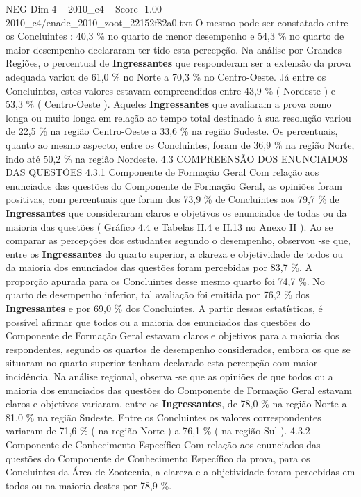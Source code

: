 \begin{textsample}{NEG Dim 4 – 2010\_c4 – Score -1.00 – 2010\_c4/enade\_2010\_zoot\_22152f82a0.txt}
O mesmo pode ser constatado entre os Concluintes : 40,3 \% no quarto de menor desempenho e 54,3 \% no quarto de maior desempenho declararam ter tido esta percepção.
Na análise por Grandes Regiões, o percentual de \textbf{Ingressantes} que responderam ser a extensão da prova adequada variou de 61,0 \% no Norte a 70,3 \% no Centro-Oeste.
Já entre os Concluintes, estes valores estavam compreendidos entre 43,9 \% ( Nordeste ) e 53,3 \% ( Centro-Oeste ).
Aqueles \textbf{Ingressantes} que avaliaram a prova como longa ou muito longa em relação ao tempo total destinado à sua resolução variou de 22,5 \% na região Centro-Oeste a 33,6 \% na região Sudeste.
Os percentuais, quanto ao mesmo aspecto, entre os Concluintes, foram de 36,9 \% na região Norte, indo até 50,2 \% na região Nordeste. 4.3 COMPREENSÃO DOS ENUNCIADOS DAS QUESTÕES 4.3.1 Componente de Formação Geral Com relação aos enunciados das questões do Componente de Formação Geral, as opiniões foram positivas, com percentuais que foram dos 73,9 \% de Concluintes aos 79,7 \% de \textbf{Ingressantes} que consideraram claros e objetivos os enunciados de todas ou da maioria das questões ( Gráfico 4.4 e Tabelas II.4 e II.13 no Anexo II ).
Ao se comparar as percepções dos estudantes segundo o desempenho, observou -se que, entre os \textbf{Ingressantes} do quarto superior, a clareza e objetividade de todos ou da maioria dos enunciados das questões foram percebidas por 83,7 \%.
A proporção apurada para os Concluintes desse mesmo quarto foi 74,7 \%.
No quarto de desempenho inferior, tal avaliação foi emitida por 76,2 \% dos \textbf{Ingressantes} e por 69,0 \% dos Concluintes.
A partir dessas estatísticas, é possível afirmar que todos ou a maioria dos enunciados das questões do Componente de Formação Geral estavam claros e objetivos para a maioria dos respondentes, segundo os quartos de desempenho considerados, embora os que se situaram no quarto superior tenham declarado esta percepção com maior incidência.
Na análise regional, observa -se que as opiniões de que todos ou a maioria dos enunciados das questões do Componente de Formação Geral estavam claros e objetivos variaram, entre os \textbf{Ingressantes}, de 78,0 \% na região Norte a 81,0 \% na região Sudeste.
Entre os Concluintes os valores correspondentes variaram de 71,6 \% ( na região Norte ) a 76,1 \% ( na região Sul ). 4.3.2 Componente de Conhecimento Específico Com relação aos enunciados das questões do Componente de Conhecimento Específico da prova, para os Concluintes da Área de Zootecnia, a clareza e a objetividade foram percebidas em todos ou na maioria destes por 78,9 \%.

\end{textsample}
